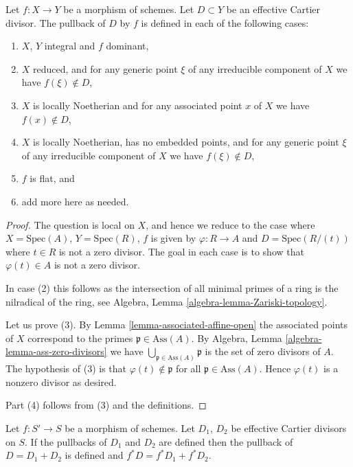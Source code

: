 \begin{lemma}
\label{lemma-pullback-effective-Cartier-defined}
Let $f : X \to Y$ be a morphism of schemes.
Let $D \subset Y$ be an effective Cartier divisor.
The pullback of $D$ by $f$ is defined in each of the following cases:
\begin{enumerate}
\item $X$, $Y$ integral and $f$ dominant,
\item $X$ reduced, and for any generic point $\xi$ of any
irreducible component of $X$ we have $f(\xi) \not \in D$,
\item $X$ is locally Noetherian and for any associated point
$x$ of $X$ we have $f(x) \not \in D$,
\item $X$ is locally Noetherian, has no embedded points, and
for any generic point $\xi$ of any irreducible component of
$X$ we have $f(\xi) \not \in D$,
\item $f$ is flat, and
\item add more here as needed.
\end{enumerate}
\end{lemma}

\begin{proof}
The question is local on $X$, and hence we reduce to the case
where $X = \text{Spec}(A)$, $Y = \text{Spec}(R)$, $f$ is
given by $\varphi : R \to A$ and
$D = \text{Spec}(R/(t))$ where $t \in R$ is not a zero divisor.
The goal in each case is to show that $\varphi(t) \in A$
is not a zero divisor.

\medskip\noindent
In case (2) this follows as the intersection of all minimal
primes of a ring is the nilradical of the ring, see
Algebra, Lemma \ref{algebra-lemma-Zariski-topology}.

\medskip\noindent
Let us prove (3). By
Lemma \ref{lemma-associated-affine-open}
the associated points of $X$ correspond to the primes
$\mathfrak p \in \text{Ass}(A)$.
By Algebra, Lemma \ref{algebra-lemma-ass-zero-divisors} we have
$\bigcup_{\mathfrak p \in \text{Ass}(A)} \mathfrak p$ is
the set of zero divisors of $A$. The hypothesis of
(3) is that $\varphi(t) \not \in \mathfrak p$ for
all $\mathfrak p \in \text{Ass}(A)$. Hence $\varphi(t)$
is a nonzero divisor as desired.

\medskip\noindent
Part (4) follows from (3) and the definitions.
\end{proof}

\begin{lemma}
\label{lemma-pullback-effective-Cartier-divisors-additive}
Let $f : S' \to S$ be a morphism of schemes.
Let $D_1$, $D_2$ be effective Cartier divisors on $S$.
If the pullbacks of $D_1$ and $D_2$ are defined then the
pullback of $D = D_1 + D_2$ is defined and
$f^*D = f^*D_1 + f^*D_2$.
\end{lemma}

